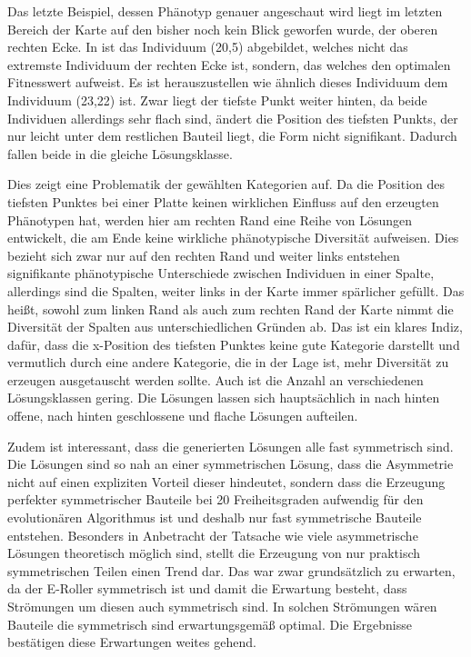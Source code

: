 
Das letzte Beispiel, dessen Phänotyp genauer angeschaut wird liegt im letzten Bereich der Karte auf den bisher noch kein Blick geworfen wurde, der oberen rechten Ecke.
In  ist das Individuum (20,5) abgebildet, welches nicht das extremste Individuum der rechten Ecke ist, sondern, das welches den optimalen Fitnesswert aufweist.
Es ist herauszustellen wie ähnlich dieses Individuum dem Individuum (23,22) ist.
Zwar liegt der tiefste Punkt weiter hinten, da beide Individuen allerdings sehr flach sind, ändert die Position des tiefsten Punkts, der nur leicht unter dem restlichen Bauteil liegt, die Form nicht signifikant.
Dadurch fallen beide in die gleiche Lösungsklasse.

Dies zeigt eine Problematik der gewählten Kategorien auf.
Da die Position des tiefsten Punktes bei einer Platte keinen wirklichen Einfluss auf den erzeugten Phänotypen hat, werden hier am rechten Rand eine Reihe von Lösungen entwickelt, die am Ende keine wirkliche phänotypische Diversität aufweisen.
Dies bezieht sich zwar nur auf den rechten Rand und weiter links entstehen signifikante phänotypische Unterschiede zwischen Individuen in einer Spalte, allerdings sind die Spalten, weiter links in der Karte immer spärlicher gefüllt.
Das heißt, sowohl zum linken Rand als auch zum rechten Rand der Karte nimmt die Diversität der Spalten aus unterschiedlichen Gründen ab.
Das ist ein klares Indiz, dafür, dass die x-Position des tiefsten Punktes keine gute Kategorie darstellt und vermutlich durch eine andere Kategorie, die in der Lage ist, mehr Diversität zu erzeugen ausgetauscht werden sollte.
Auch ist die Anzahl an verschiedenen Lösungsklassen gering. Die Lösungen lassen sich hauptsächlich in nach hinten offene, nach hinten geschlossene und flache Lösungen aufteilen.

Zudem ist interessant, dass die generierten Lösungen alle fast symmetrisch sind.
Die Lösungen sind so nah an einer symmetrischen Lösung, dass die Asymmetrie nicht auf einen expliziten Vorteil dieser hindeutet, sondern dass die Erzeugung perfekter symmetrischer Bauteile bei 20 Freiheitsgraden aufwendig für den evolutionären Algorithmus ist und deshalb nur fast symmetrische Bauteile entstehen.
Besonders in Anbetracht der Tatsache wie viele asymmetrische Lösungen theoretisch möglich sind, stellt die Erzeugung von nur praktisch symmetrischen Teilen einen Trend dar.
Das war zwar grundsätzlich zu erwarten, da der E-Roller symmetrisch ist und damit die Erwartung besteht, dass Strömungen um diesen auch symmetrisch sind.
In solchen Strömungen wären Bauteile die symmetrisch sind erwartungsgemäß optimal. 
Die Ergebnisse bestätigen diese Erwartungen weites gehend.

